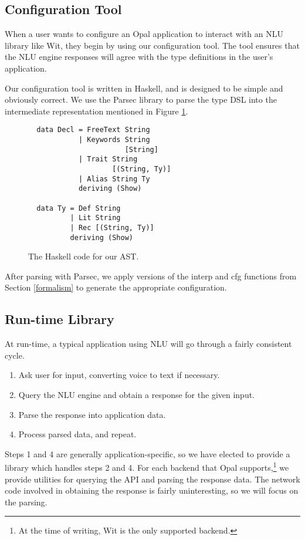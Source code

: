 \documentclass[twocolumn]{article}
\newcommand{\ff}[1]{\textsf{#1}}
\begin{document}
\subsection{Configuration Tool}
When a user wants to configure an Opal application to interact with an NLU
library like Wit, they begin by using our configuration tool. The tool ensures
that the NLU engine responses will agree with the type definitions in the user's
application.

Our configuration tool is written in Haskell, and is designed to be simple and
obviously correct. We use the Parsec library to parse the type DSL into the
intermediate representation mentioned in Figure \ref{fig:hs_ast}.\cite{parsec}

\begin{figure}
\begin{verbatim}
  data Decl = FreeText String
            | Keywords String
                       [String]
            | Trait String
                    [(String, Ty)]
            | Alias String Ty
            deriving (Show)

  data Ty = Def String
          | Lit String
          | Rec [(String, Ty)]
          deriving (Show)
\end{verbatim}
  \caption{The Haskell code for our AST.}
  \label{fig:hs_ast}
\end{figure}

After parsing with Parsec, we apply versions of the \ff{interp} and \ff{cfg}
functions from Section \ref{formalism} to generate the appropriate
configuration.

\subsection{Run-time Library}
At run-time, a typical application using NLU will go through a fairly consistent
cycle.
\begin{enumerate}
\item Ask user for input, converting voice to text if necessary.
\item Query the NLU engine and obtain a response for the given input.
\item Parse the response into application data.
\item Process parsed data, and repeat.
\end{enumerate}
Steps 1 and 4 are generally application-specific, so we have elected to provide
a library which handles steps 2 and 4. For each backend that Opal
supports,\footnote{At the time of writing, Wit is the only supported backend.}
we provide utilities for querying the API and parsing the response data. The
network code involved in obtaining the response is fairly uninteresting, so we
will focus on the parsing.
\end{document}
